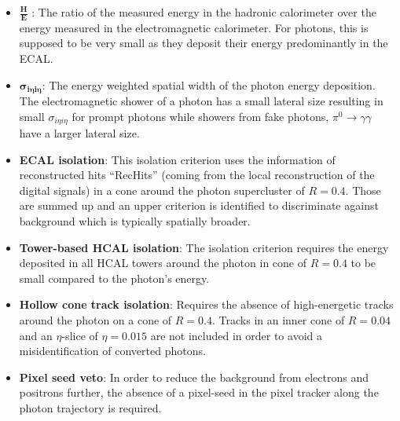 \begin{itemize}
 \item $\frac{\textbf{H}}{\textbf{E}}$ : The ratio of the measured energy in the hadronic calorimeter over the energy measured in the electromagnetic calorimeter. 
                                                    For photons, this is supposed to be very small as they deposit their energy predominantly in the ECAL.
 \item $\mathbold{\sigma_{i\eta i \eta}}$: The energy weighted spatial width of the photon energy deposition. The electromagnetic shower of a photon has a small lateral size 
                                           resulting in small $\sigma_{i\eta i \eta}$ for prompt photons while showers from fake photons, \eg $\pi^{0} \rightarrow \gamma \gamma$
                                           have a larger lateral size.
 \item \textbf{ECAL isolation}: This isolation criterion uses the information of reconstructed hits ``RecHits'' (coming from the local reconstruction of the digital signals) 
                                in a cone around the photon supercluster of $R=0.4$. Those are summed up and an upper criterion is identified to discriminate against 
                                background which is typically spatially broader.  
 \item \textbf{Tower-based HCAL isolation}: The isolation criterion requires the energy deposited in all HCAL towers around the photon in cone of $R=0.4$ to be small compared to the 
                                            photon's energy. 
 \item \textbf{Hollow cone track isolation}: Requires the absence of high-energetic tracks around the photon on a cone of $R=0.4$. Tracks in an inner cone of $R=0.04$ and an $\eta$-slice of $\eta=0.015$ are not included in order to avoid a misidentification of converted photons.
 \item \textbf{Pixel seed veto}: In order to reduce the background from electrons and positrons further, the absence of a pixel-seed in the pixel tracker along the photon trajectory is required.
\end{itemize}

